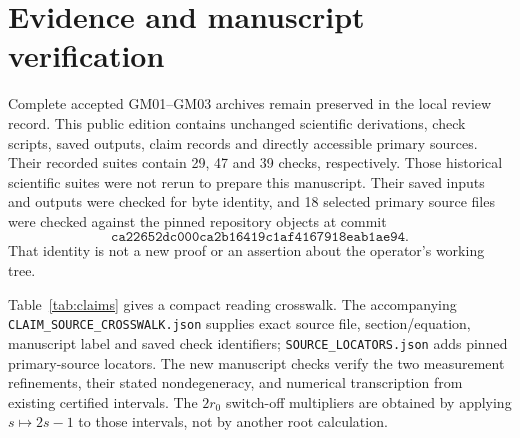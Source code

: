 \section{Evidence and manuscript verification}\label{app:evidence}
Complete accepted GM01--GM03 archives remain preserved in the local review record. This public edition contains unchanged scientific derivations, check scripts, saved outputs, claim records and directly accessible primary sources. Their recorded suites contain 29, 47 and 39 checks, respectively. Those historical scientific suites were not rerun to prepare this manuscript. Their saved inputs and outputs were checked for byte identity, and 18 selected primary source files were checked against the pinned repository objects at commit
\[
 \texttt{ca22652dc000ca2b16419c1af4167918eab1ae94}.
\]
That identity is not a new proof or an assertion about the operator's working tree.

Table~\ref{tab:claims} gives a compact reading crosswalk. The accompanying \texttt{CLAIM\_SOURCE\_CROSSWALK.json} supplies exact source file, section/equation, manuscript label and saved check identifiers; \texttt{SOURCE\_LOCATORS.json} adds pinned primary-source locators. The new manuscript checks verify the two measurement refinements, their stated nondegeneracy, and numerical transcription from existing certified intervals. The \(2r_0\) switch-off multipliers are obtained by applying \(s\mapsto2s-1\) to those intervals, not by another root calculation.

